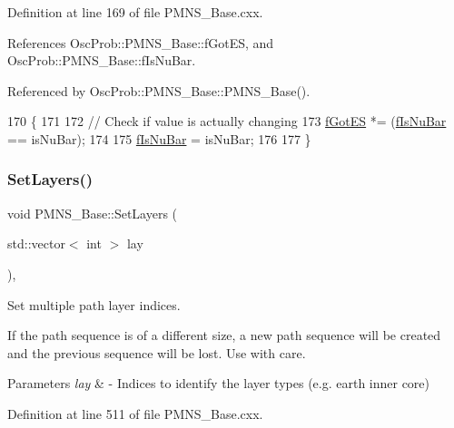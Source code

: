Definition at line 169 of file P\+M\+N\+S\+\_\+\+Base.\+cxx.



References Osc\+Prob\+::\+P\+M\+N\+S\+\_\+\+Base\+::f\+Got\+ES, and Osc\+Prob\+::\+P\+M\+N\+S\+\_\+\+Base\+::f\+Is\+Nu\+Bar.



Referenced by Osc\+Prob\+::\+P\+M\+N\+S\+\_\+\+Base\+::\+P\+M\+N\+S\+\_\+\+Base().


\begin{DoxyCode}
170 \{
171 
172   \textcolor{comment}{// Check if value is actually changing}
173   \hyperlink{classOscProb_1_1PMNS__Base_a6dc5cd010d2d70b2324745b4e53e9839}{fGotES} *= (\hyperlink{classOscProb_1_1PMNS__Base_a0ebaeaefab36a3ff381c6293faedfdd6}{fIsNuBar} == isNuBar);
174 
175   \hyperlink{classOscProb_1_1PMNS__Base_a0ebaeaefab36a3ff381c6293faedfdd6}{fIsNuBar} = isNuBar;
176 
177 \}
\end{DoxyCode}
\mbox{\label{classOscProb_1_1PMNS__Base_a904e580edf89fb98bf9a6397739b4ebe}} 
\subsubsection{\texorpdfstring{Set\+Layers()}{SetLayers()}}
{\footnotesize\ttfamily void P\+M\+N\+S\+\_\+\+Base\+::\+Set\+Layers (\begin{DoxyParamCaption}\item[{std\+::vector$<$ int $>$}]{lay }\end{DoxyParamCaption})\hspace{0.3cm}{\ttfamily [virtual]}, {\ttfamily [inherited]}}

Set multiple path layer indices.

If the path sequence is of a different size, a new path sequence will be created and the previous sequence will be lost. Use with care.


\begin{DoxyParams}{Parameters}
{\em lay} & -\/ Indices to identify the layer types (e.\+g. earth inner core) \\
\hline
\end{DoxyParams}


Definition at line 511 of file P\+M\+N\+S\+\_\+\+Base.\+cxx.



